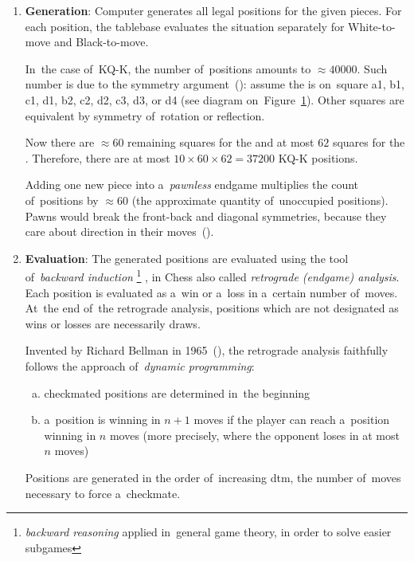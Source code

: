 \begin{enumerate}[1]
    \setlength\itemsep{-.5ex}
  \item \textbf{Generation}:
    Computer generates all legal positions for the given pieces.
    For each position, the tablebase evaluates the situation separately for White-to-move and Black-to-move.

    In~the case of~KQ-K, the number of~positions amounts to $\approx 40000$.
    Such number is due to the symmetry argument~(\cite{Levy2009computers}):
    assume the \kingB{} is on~square a1, b1, c1, d1, b2, c2, d2, c3, d3, or d4 (see diagram on~Figure~\ref{fig:non-symmetric-black-king}).
    Other squares are equivalent by symmetry of~rotation or reflection.

    Now there are $\approx 60$ remaining squares for the \king{} and at most $62$ squares for the \queen.
    Therefore, there are at most $10 \times 60 \times 62 = 37200$ KQ-K positions.
    \begin{figure}[H]
      \centering
      \newgame
      \showboard
      \label{fig:non-symmetric-black-king}
    \end{figure}

    Adding one new piece into a~\emph{pawnless} endgame multiplies the count of~positions by $\approx 60$ (the approximate quantity of~unoccupied positions).
    Pawns would break the front-back and diagonal symmetries, because they care about direction in their moves~(\cite{Muller2006EGTB}).

  \item \textbf{Evaluation}:
    The generated positions are evaluated using the tool of~\emph{backward induction}%
    \footnote{\emph{backward reasoning} applied in~general game theory, in order to solve easier subgames}
    , in Chess also called \emph{retrograde (endgame) analysis}.
    Each position is evaluated as a~win or a~loss in a~certain number of~moves.
    At~the end of~the retrograde analysis, positions which are not designated as wins or losses are necessarily draws.

    Invented by Richard Bellman in 1965~(\cite{Bellman1965application}), the retrograde analysis faithfully follows the approach of~\emph{dynamic programming}:
    \begin{enumerate}[(a)]
      \item checkmated positions are determined in~the beginning
      \item a~position is winning in $n+1$ moves if the player can reach a~position winning in $n$ moves (more precisely, where the opponent loses in at most $n$ moves)
    \end{enumerate}
    Positions are generated in the order of~increasing \acrfull{dtm}, the number of~moves necessary to force a~checkmate.


\end{enumerate}
